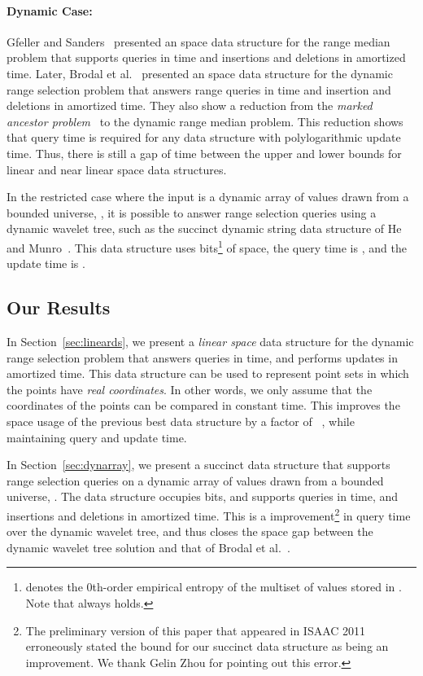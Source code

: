\documentclass{llncs}
\begin{document}
\paragraph{Dynamic Case:}

Gfeller and Sanders~\cite{GS09} presented an  space data
structure for the range median problem that supports queries in
 time and insertions and deletions in 
amortized time. Later, Brodal et al.~\cite{BJ09,BGJS10} presented an
 space data structure for the dynamic range
selection problem that answers range queries in  time and insertion and deletions in 
amortized time.  They also show a reduction from the \emph{marked
  ancestor problem}~\cite{AHR98} to the dynamic range median problem.
This reduction shows that  query time is
required for any data structure with polylogarithmic update time.
Thus, there is still a gap of  time between
the upper and lower bounds for linear and near linear space data
structures. 

In the restricted case where the input is a dynamic array  of 
values drawn from a bounded universe, , it is possible to
answer range selection queries using a dynamic wavelet tree, such as
the succinct dynamic string data structure of He and
Munro~\cite{HM10}.  This data structure uses  bits\footnote{ denotes the 0th-order empirical
  entropy of the multiset of values stored in .  Note that  always holds.} of space, the query time is
, and the update time is
.

\subsection{Our Results\label{sec:ourresults}}

In Section~\ref{sec:lineards}, we present a \emph{linear space} data
structure for the dynamic range selection problem that answers queries
in  time, and performs updates in  amortized time. This data structure can be used to
represent point sets in which the points have \emph{real coordinates}.
In other words, we only assume that the coordinates of the points can
be compared in constant time.  This improves the space usage of the
previous best data structure by a factor of ~\cite{BGJS10}, while maintaining query and update time.

In Section~\ref{sec:dynarray}, we present a succinct data structure
that supports range selection queries on a dynamic array  of values
drawn from a bounded universe, .  The data structure
occupies  bits, and supports
queries in  time, and insertions and deletions in  amortized time.
This is a  improvement\footnote{The
  preliminary version of this paper that appeared in ISAAC 2011
  erroneously stated the bound for our succinct data structure as
  being an  improvement.  We thank Gelin Zhou for
  pointing out this error.} in query time over the dynamic wavelet
tree, and thus closes the space gap between the dynamic wavelet tree
solution and that of Brodal et al.~\cite{BGJS10}.
\end{document}
